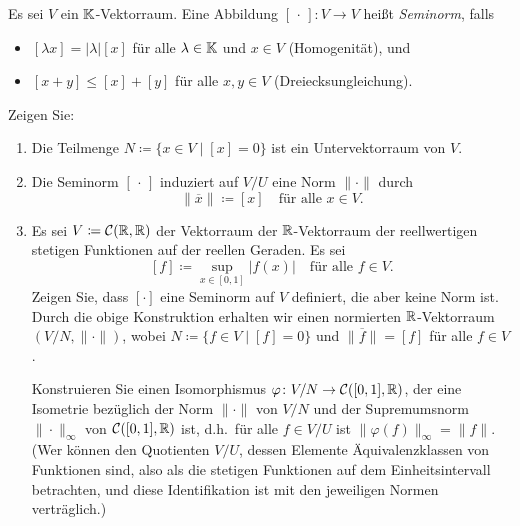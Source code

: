 \begin{question}
  Es sei $V$ ein $\mathbb{K}$-Vektorraum.
  Eine Abbildung $[\,\cdot\,] \colon V \to V$ heißt \emph{Seminorm}, falls
  \begin{itemize}
    \item
      $[\lambda x] = |\lambda| [x]$ für alle $\lambda \in \mathbb{K}$ und $x \in V$ (Homogenität), und
    \item
      $[x + y] \leq [x] + [y]$ für alle $x, y \in V$ (Dreiecksungleichung).
  \end{itemize}
  Zeigen Sie:
  \begin{enumerate}[leftmargin=*]
    \item
      Die Teilmenge $N \coloneqq \{x \in V \mid [x] = 0\}$ ist ein Untervektorraum von $V$.
    \item
      Die Seminorm $[\,\cdot\,]$ induziert auf $V\!/U$ eine Norm $\|\cdot\|$ durch
      \[
        \| \overline{x} \| \coloneqq [x]
        \quad
        \text{für alle $x \in V$}.
      \]
    \item
      Es sei $V \coloneqq \mathcal{C}(\mathbb{R}, \mathbb{R})$ der Vektorraum der $\mathbb{R}$-Vektorraum der reellwertigen stetigen Funktionen auf der reellen Geraden.
      Es sei
      \[
        [f] \coloneqq \sup_{x \in [0,1]} |f(x)|
        \quad
       \text{für alle $f \in V$}.
      \]
      Zeigen Sie, dass $[\cdot]$ eine Seminorm auf $V$ definiert, die aber keine Norm ist.
      Durch die obige Konstruktion erhalten wir einen normierten $\mathbb{R}$-Vektorraum $(V\!/N, \|\cdot\|)$, wobei $N \coloneqq \{f \in V \mid [f] = 0\}$ und $\|\overline{f}\| = [f]$ für alle $f \in V$.
      
      Konstruieren Sie einen Isomorphismus $\varphi \colon V\!/N \to \mathcal{C}([0,1], \mathbb{R})$, der eine Isometrie bezüglich der Norm $\|\cdot\|$ von $V\!/N$ und der Supremumsnorm $\|\cdot\|_\infty$ von $\mathcal{C}([0,1], \mathbb{R})$ ist, d.h.\ für alle $f \in V\!/U$ ist $\|\varphi(f)\|_\infty = \|f\|$.
      (Wer können den Quotienten $V\!/U$, dessen Elemente Äquivalenzklassen von Funktionen sind, also als die stetigen Funktionen auf dem Einheitsintervall betrachten, und diese Identifikation ist mit den jeweiligen Normen verträglich.)
  \end{enumerate}
\end{question}


